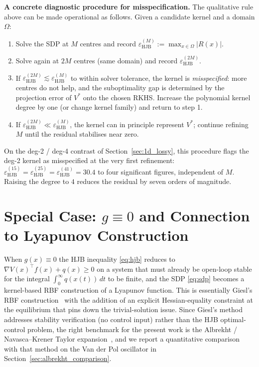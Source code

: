 \documentclass[11pt]{article}
\begin{document}
\textbf{A concrete diagnostic procedure for misspecification.} The qualitative rule above can be made operational as follows. Given a candidate kernel and a domain $\Omega$:
\begin{enumerate}
\item Solve the SDP at $M$ centres and record $\varepsilon_{\mathrm{HJB}}^{(M)} := \max_{x\in\Omega}|R(x)|$.
\item Solve again at $2M$ centres (same domain) and record $\varepsilon_{\mathrm{HJB}}^{(2M)}$.
\item If $\varepsilon_{\mathrm{HJB}}^{(2M)} \lesssim \varepsilon_{\mathrm{HJB}}^{(M)}$ to within solver tolerance, the kernel is \emph{misspecified}: more centres do not help, and the suboptimality gap is determined by the projection error of $V^*$ onto the chosen RKHS. Increase the polynomial kernel degree by one (or change kernel family) and return to step 1.
\item If $\varepsilon_{\mathrm{HJB}}^{(2M)} \ll \varepsilon_{\mathrm{HJB}}^{(M)}$, the kernel can in principle represent $V^*$; continue refining $M$ until the residual stabilises near zero.
\end{enumerate}
On the deg-2 / deg-4 contrast of Section~\ref{sec:1d_lossy}, this procedure flags the deg-2 kernel as misspecified at the very first refinement: $\varepsilon_{\mathrm{HJB}}^{(15)} = \varepsilon_{\mathrm{HJB}}^{(25)} = \varepsilon_{\mathrm{HJB}}^{(41)} = 30.4$ to four significant figures, independent of $M$. Raising the degree to $4$ reduces the residual by seven orders of magnitude.

\section{Special Case: $g \equiv 0$ and Connection to Lyapunov Construction}
\label{sec:giesl_relationship}

When $g(x)\equiv 0$ the HJB inequality \eqref{eq:hjb} reduces to $\nabla V(x)^\top f(x) + q(x) \geq 0$ on a system that must already be open-loop stable for the integral $\int_0^\infty q(x(t))\,dt$ to be finite, and the SDP \eqref{eq:sdp} becomes a kernel-based RBF construction of a Lyapunov function. This is essentially Giesl's RBF construction~\cite{giesl2007construction} with the addition of an explicit Hessian-equality constraint at the equilibrium that pins down the trivial-solution issue. Since Giesl's method addresses stability verification (no control input) rather than the HJB optimal-control problem, the right benchmark for the present work is the Albrekht / Navasca--Krener Taylor expansion~\cite{albrekht_1961,navasca_krener_2000}, and we report a quantitative comparison with that method on the Van der Pol oscillator in Section~\ref{sec:albrekht_comparison}.
\end{document}
